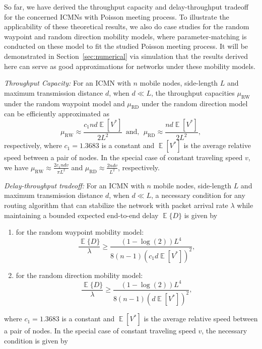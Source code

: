\documentclass[twocolumn, 10pt]{svjour3}         \smartqed  \usepackage{graphicx}
\DeclareMathOperator*{\E}{\mathbb{E}}
\begin{document}
So far, we have derived the throughput capacity and delay-throughput tradeoff for the concerned ICMNs with Poisson meeting process.
To illustrate the applicability of these theoretical results, we also do case studies for the random waypoint and random direction mobility models, where parameter-matching is conducted on these model to fit the studied Poisson meeting process. It will be demonstrated in Section~\ref{sec:numerical} via simulation that the  results derived here can serve as good approximations for networks under these mobility models.








\emph{Throughput Capacity:}
For an ICMN with $n$ mobile nodes, side-length $L$ and maximum transmission distance $d$,  when $d \ll L$, 
the throughput capacities  $\mu_\text{RW}$ under the  random waypoint  model and $\mu_\text{RD}$ under the random direction   model  can be efficiently approximated as
\begin{equation}\label{eqn:appr_capa}
	\mu_{\text{RW}} \approx \frac{ c_1 n d   \E[V^*]}{ 2 L^2}~~\mbox{and},~~
	\mu_\text{RD} \approx \frac{ n d   \E[V^*]}{2 L^2},
\end{equation}
respectively, where $c_1 = 1.3683$ is a constant and  $\E[V^*]$ is the average relative speed between a pair of nodes. In the special case of constant traveling speed  $v$, we have $\mu_{\text{RW}} \approx \frac{2 c_1 n d v}{ \pi L^2}$ and $\mu_\text{RD} \approx \frac{2 n d  v}{L^2} $, respectively.


\emph{Delay-throughput tradeoff:}
For an ICMN with $n$ mobile nodes, side-length $L$ and maximum transmission distance $d$,
when $d \ll L$, a necessary condition for any routing algorithm that can stabilize the network with packet arrival rate $\lambda$ while maintaining a bounded expected end-to-end delay $\E\{D\}$ is given by
\begin{enumerate}
	\item for the random waypoint mobility model:
\begin{equation}
	\frac{\E\{D\}}{\lambda} \geq \frac{  (1-\log (2) )L^4}{8(n-1) (c_1 d  \E [V^*])^2   },
\end{equation}
  \item for the random direction mobility model:
\begin{equation}
	\frac{\E\{D\}}{\lambda} \geq \frac{   (1-\log (2) ) L^4}{8(n-1) (  d  \E [V^*])^2   },  
\end{equation} 
\end{enumerate}
where $c_1 = 1.3683$ is a constant and  $\E[V^*]$ is the average relative speed between a pair of nodes. In the special case of constant traveling speed  $v$, the necessary condition is given by
\end{document}
